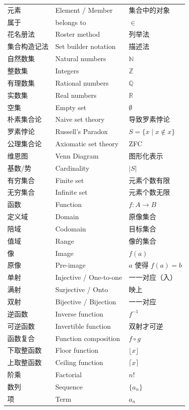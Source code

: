 \documentclass[UTF8,11pt,a4paper]{ctexbook}   %
\theoremstyle{definition}
\begin{document}
\begin{longtable}{|p{4.8cm}|p{4.8cm}|p{4.8cm}|}
元素 & Element / Member & 集合中的对象 \\
属于 & belongs to & $\in$ \\
花名册法 & Roster method & 列举法 \\
集合构造记法 & Set builder notation & 描述法 \\
自然数集 & Natural numbers & $\mathbb{N}$ \\
整数集 & Integers & $\mathbb{Z}$ \\
有理数集 & Rational numbers & $\mathbb{Q}$ \\
实数集 & Real numbers & $\mathbb{R}$ \\
空集 & Empty set & $\emptyset$ \\
朴素集合论 & Naive set theory & 导致罗素悖论 \\
罗素悖论 & Russell's Paradox & $S = \{x \mid x \notin x\}$ \\
公理集合论 & Axiomatic set theory & ZFC \\
维恩图 & Venn Diagram & 图形化表示 \\
基数/势 & Cardinality & $|S|$ \\
有穷集合 & Finite set & 元素个数有限 \\
无穷集合 & Infinite set & 元素个数无限 \\
函数 & Function & $f: A \to B$ \\
定义域 & Domain & 原像集合 \\
陪域 & Codomain & 目标集合 \\
值域 & Range & 像的集合 \\
像 & Image & $f(a)$ \\
原像 & Pre-image & $a$ 使得 $f(a)=b$ \\
单射 & Injective / One-to-one & 一一对应（入） \\
满射 & Surjective / Onto & 映上 \\
双射 & Bijective / Bijection & 一一对应 \\
逆函数 & Inverse function & $f^{-1}$ \\
可逆函数 & Invertible function & 双射才可逆 \\
函数复合 & Function composition & $f \circ g$ \\
下取整函数 & Floor function & $\lfloor x \rfloor$ \\
上取整函数 & Ceiling function & $\lceil x \rceil$ \\
阶乘 & Factorial & $n!$ \\
数列 & Sequence & $\{a_n\}$ \\
项 & Term & $a_n$ \\

\end{longtable}
\end{document}
